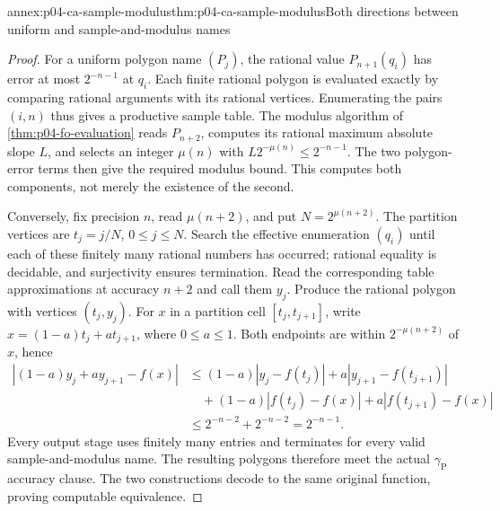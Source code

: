 
\begin{annexitem}{annex:p04-ca-sample-modulus}{thm:p04-ca-sample-modulus}{Both directions between uniform and sample-and-modulus names}
\begin{proof}
For a uniform polygon name \((P_j)\), the rational value
\(P_{n+1}(q_i)\) has error at most \(2^{-n-1}\) at \(q_i\).
Each finite rational polygon is evaluated exactly by comparing rational
arguments with its rational vertices. Enumerating the pairs \((i,n)\)
thus gives a productive sample table. The modulus algorithm of
\cref{thm:p04-fo-evaluation} reads \(P_{n+2}\), computes its rational
maximum absolute slope \(L\), and selects an integer \(\mu(n)\)
with \(L2^{-\mu(n)}\leq2^{-n-1}\). The two polygon-error terms
then give the required modulus bound. This computes both components,
not merely the existence of the second.

Conversely, fix precision \(n\), read \(\mu(n+2)\), and put
\(N=2^{\mu(n+2)}\). The partition vertices are \(t_j=j/N\),
\(0\leq j\leq N\). Search the effective enumeration \((q_i)\)
until each of these finitely many rational numbers has occurred;
rational equality is decidable, and surjectivity ensures termination.
Read the corresponding table approximations at accuracy \(n+2\)
and call them \(y_j\). Produce the rational polygon with vertices
\((t_j,y_j)\).
For \(x\) in a partition cell \([t_j,t_{j+1}]\), write
\(x=(1-a)t_j+at_{j+1}\), where \(0\leq a\leq1\).
Both endpoints are within \(2^{-\mu(n+2)}\) of \(x\), hence
\[
 \begin{split}
 |(1-a)y_j+ay_{j+1}-f(x)|
 &\leq (1-a)|y_j-f(t_j)|+a|y_{j+1}-f(t_{j+1})|\\
 &\quad +(1-a)|f(t_j)-f(x)|+a|f(t_{j+1})-f(x)|\\
 &\leq2^{-n-2}+2^{-n-2}=2^{-n-1}.
 \end{split}
\]
Every output stage uses finitely many entries and terminates for every
valid sample-and-modulus name. The resulting polygons therefore meet
the actual \(\gamma_{\mathrm P}\) accuracy clause. The two constructions
decode to the same original function, proving computable equivalence.
\end{proof}
\end{annexitem}

